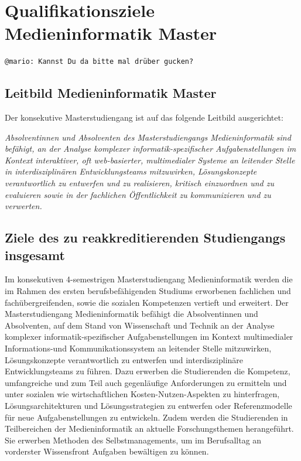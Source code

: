 \chapter{Qualifikationsziele Medieninformatik
Master}\label{qualifikationsziele-medieninformatik-master}

\begin{verbatim}
@mario: Kannst Du da bitte mal drüber gucken?
\end{verbatim}

\section{Leitbild Medieninformatik
Master}\label{leitbild-medieninformatik-master}

Der konsekutive Masterstudiengang ist auf das folgende Leitbild
ausgerichtet:

\emph{Absolventinnen und Absolventen des Masterstudiengangs
Medieninformatik sind befähigt, an der Analyse komplexer
informatik-spezifischer Aufgabenstellungen im Kontext interaktiver, oft
web-basierter, multimedialer Systeme an leitender Stelle in
interdisziplinären Entwicklungsteams mitzuwirken, Lösungskonzepte
verantwortlich zu entwerfen und zu realisieren, kritisch einzuordnen und
zu evaluieren sowie in der fachlichen Öffentlichkeit zu kommunizieren
und zu verwerten.}

\section{Ziele des zu reakkreditierenden Studiengangs
insgesamt}\label{ziele-des-zu-reakkreditierenden-studiengangs-insgesamt-1}

Im konsekutiven 4-semestrigen Masterstudiengang Medieninformatik werden
die im Rahmen des ersten berufsbefähigenden Studiums erworbenen
fachlichen und fachübergreifenden, sowie die sozialen Kompetenzen
vertieft und erweitert. Der Masterstudiengang Medieninformatik befähigt
die Absolventinnen und Absolventen, auf dem Stand von Wissenschaft und
Technik an der Analyse komplexer informatik-spezifischer
Aufgabenstellungen im Kontext multimedialer Informations-und
Kommunikationssystem an leitender Stelle mitzuwirken, Lösungskonzepte
verantwortlich zu entwerfen und interdisziplinäre Entwicklungsteams zu
führen. Dazu erwerben die Studierenden die Kompetenz, umfangreiche und
zum Teil auch gegenläufige Anforderungen zu ermitteln und unter sozialen
wie wirtschaftlichen Kosten-Nutzen-Aspekten zu hinterfragen,
Lösungsarchitekturen und Lösungsstrategien zu entwerfen oder
Referenzmodelle für neue Aufgabenstellungen zu entwickeln. Zudem werden
die Studierenden in Teilbereichen der Medieninformatik an aktuelle
Forschungsthemen herangeführt. Sie erwerben Methoden des
Selbstmanagements, um im Berufsalltag an vorderster Wissensfront
Aufgaben bewältigen zu können.

